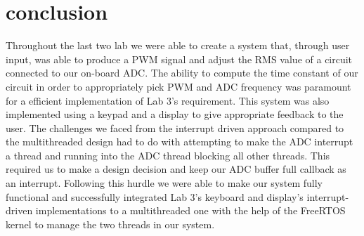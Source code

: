 \section{conclusion}
Throughout the last two lab we were able to create a system that, through user input, was able to produce a PWM signal and adjust the RMS value of a circuit connected to our on-board ADC. The ability to compute the time constant of our circuit in order to appropriately pick PWM and ADC frequency was paramount for a efficient implementation of Lab 3's requirement. This system was also implemented using a keypad and a display to give appropriate feedback to the user. The challenges we faced from the interrupt driven approach compared to the multithreaded design had to do with attempting to make the ADC interrupt a thread and running into the ADC thread blocking all other threads. This required us to make a design decision and keep our ADC buffer full callback as an interrupt. Following this hurdle we were able to make our system fully functional and successfully integrated Lab 3's keyboard and display's interrupt-driven implementations to a multithreaded one with the help of the FreeRTOS kernel to manage the two threads in our system.